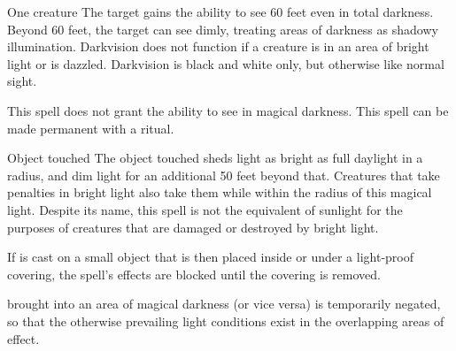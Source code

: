 \begin{spellheader}
    \spellrng{\rngtouch}
    \spelldur{\durlong}
\end{spellheader}
\begin{spelleffects}
    \begin{spelltarget}{One creature}
        \spelleffect The target gains the ability to see 60 feet even in total darkness. Beyond 60 feet, the target can see dimly, treating areas of darkness as shadowy illumination. Darkvision does not function if a creature is in an area of bright light or is dazzled. Darkvision is black and white only, but otherwise like normal sight.
    \end{spelltarget}
\end{spelleffects}
\begin{spellfooter}
    \spellnotes This spell does not grant the ability to see in magical darkness. This spell can be made permanent with a  ritual.
\end{spellfooter}

\begin{spellheader}
    \spellrng{\rngtouch}
    \spelldur{\durlong \dismissable}
\end{spellheader}
\begin{spelleffects}
    \begin{spelltarget}{Object touched}
        \spelleffect The object touched sheds light as bright as full daylight in a \arealarge radius, and dim light for an additional 50 feet beyond that. Creatures that take penalties in bright light also take them while within the radius of this magical light. Despite its name, this spell is not the equivalent of sunlight for the purposes of creatures that are damaged or destroyed by bright light.
        \par If  is cast on a small object that is then placed inside or under a light-proof covering, the spell's effects are blocked until the covering is removed.
    \end{spelltarget}
\end{spelleffects}
\begin{spellfooter}
    \spellnotes {} brought into an area of magical darkness (or vice versa) is temporarily negated, so that the otherwise prevailing light conditions exist in the overlapping areas of effect.
\end{spellfooter}

